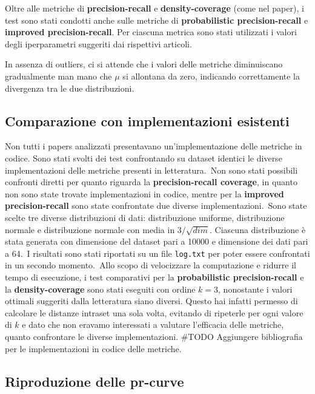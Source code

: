 Oltre alle metriche di \textbf{precision-recall} e \textbf{density-coverage} (come nel paper), i test sono stati condotti anche sulle metriche di \textbf{probabilistic precision-recall} e \textbf{improved precision-recall}. Per ciascuna metrica sono stati utilizzati i valori degli iperparametri suggeriti dai rispettivi articoli.

In assenza di outliers, ci si attende che i valori delle metriche diminuiscano gradualmente man mano che \(\mu\) si allontana da zero, indicando correttamente la divergenza tra le due distribuzioni.

\subsection{Comparazione con implementazioni esistenti}

Non tutti i papers analizzati presentavano un'implementazione delle metriche in codice. Sono stati svolti dei test confrontando su dataset identici le diverse implementazioni delle metriche presenti in letteratura.\
Non sono stati possibili confronti diretti per quanto riguarda la \textbf{precision-recall coverage}, in quanto non sono state trovate implementazioni in codice, mentre per la \textbf{improved precision-recall} sono state confrontate due diverse implementazioni.\
Sono state scelte tre diverse distribuzioni di dati: distribuzione uniforme, distribuzione normale e distribuzione normale con media in \(3/\sqrt{dim}\). Ciascuna distribuzione è stata generata con dimensione del dataset pari a 10000 e dimensione dei dati pari a 64.\
I risultati sono stati riportati su un file \texttt{log.txt} per poter essere confrontati in un secondo momento.\
Allo scopo di velocizzare la computazione e ridurre il tempo di esecuzione, i test comparativi per la \textbf{probabilistic precision-recall} e la \textbf{density-coverage} sono stati eseguiti con ordine \( k = 3 \), nonostante i valori ottimali suggeriti dalla letteratura siano diversi. Questo hai infatti permesso di calcolare le distanze intraset una sola volta, evitando di ripeterle per ogni valore di \( k \) e dato che non eravamo interessati a valutare l'efficacia delle metriche, quanto confrontare le diverse implementazioni.
#TODO Aggiungere bibliografia per le implementazioni in codice delle metriche.

\subsection{Riproduzione delle pr-curve}

